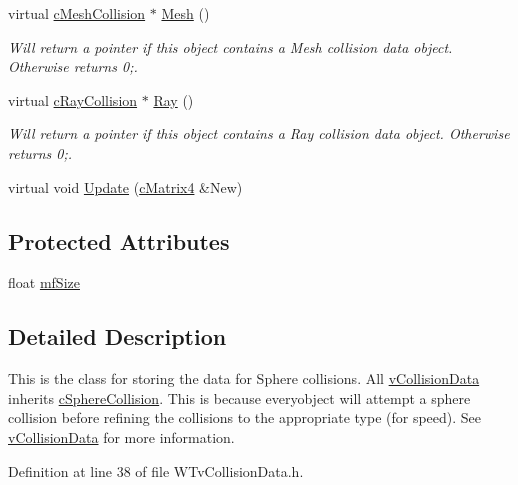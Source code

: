 \begin{DoxyCompactItemize}
virtual \hyperlink{classc_mesh_collision}{cMeshCollision} $\ast$ \hyperlink{classc_sphere_collision_a5200a3ef7772e84f0e836f8558562550}{Mesh} ()
\begin{DoxyCompactList}\small\item\em Will return a pointer if this object contains a Mesh collision data object. Otherwise returns 0;. \item\end{DoxyCompactList}\item 
virtual \hyperlink{classc_ray_collision}{cRayCollision} $\ast$ \hyperlink{classc_sphere_collision_a01bc77603bcc299e5b012406505541af}{Ray} ()
\begin{DoxyCompactList}\small\item\em Will return a pointer if this object contains a Ray collision data object. Otherwise returns 0;. \item\end{DoxyCompactList}\item 
virtual void \hyperlink{classc_sphere_collision_a98daa58acea17db6bcd4a47239521016}{Update} (\hyperlink{classc_matrix4}{cMatrix4} \&New)
\end{DoxyCompactItemize}
\subsection*{Protected Attributes}
\begin{DoxyCompactItemize}
\item 
float \hyperlink{classc_sphere_collision_a0ed0a2b1665c13d57b9b263cf32eff21}{mfSize}
\end{DoxyCompactItemize}


\subsection{Detailed Description}
This is the class for storing the data for Sphere collisions. All \hyperlink{classv_collision_data}{vCollisionData} inherits \hyperlink{classc_sphere_collision}{cSphereCollision}. This is because everyobject will attempt a sphere collision before refining the collisions to the appropriate type (for speed). See \hyperlink{classv_collision_data}{vCollisionData} for more information. 

Definition at line 38 of file WTvCollisionData.h.



